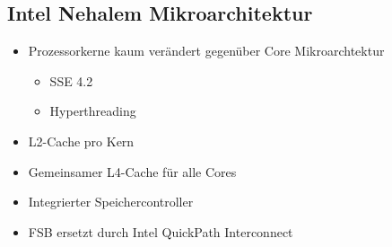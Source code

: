 \subsection{Intel Nehalem Mikroarchitektur}
\begin{itemize}
	\item Prozessorkerne kaum verändert gegenüber Core Mikroarchtektur
	\begin{itemize}
		\item SSE 4.2
		\item Hyperthreading
	\end{itemize}
	\item L2-Cache pro Kern
	\item Gemeinsamer L4-Cache für alle Cores
	\item Integrierter Speichercontroller
	\item FSB ersetzt durch Intel QuickPath Interconnect
\end{itemize}